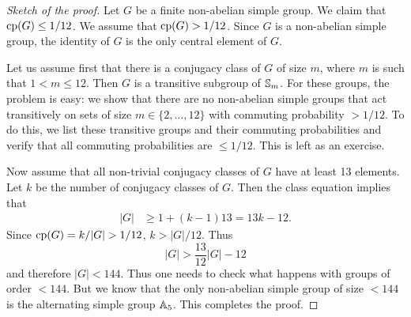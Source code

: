 \begin{proof}[Sketch of the proof]
Let $G$ be a finite non-abelian simple group. We claim that 
$\operatorname{cp}(G)\leq1/12$. 
We assume that $\operatorname{cp}(G)>1/12$. Since
$G$ is a non-abelian simple group, 
the identity of $G$ is the only central element of $G$. 

Let us assume first that there is a conjugacy class of $G$ of size $m$, where
$m$ is such that $1<m\leq 12$. Then $G$ is a transitive subgroup of $\mathbb{S}_m$.
For these groups, the problem is easy: we show that there are no non-abelian simple groups
that act transitively on sets of size $m\in\{2,\dots,12\}$ with commuting
probability $>1/12$. To do this, we list these transitive groups and their commuting
probabilities and verify that all commuting probabilities are $\leq
1/12$. This is left as an exercise. 

Now assume that all non-trivial conjugacy classes of $G$ have at least 13 elements. Let $k$ be the number of conjugacy classes of $G$. 
Then the class equation implies that
\begin{align*}
	|G|&\geq 1+(k-1)13=13k-12.
\end{align*}
Since $\cp(G)=k/|G|>1/12$, $k>|G|/12$. Thus 
\[
|G|>\frac{13}{12}|G|-12
\]
and therefore $|G|<144$. Thus one needs to check what happens with groups
of order $<144$. 
But we know that the only non-abelian simple group of size
$<144$ is the alternating simple group $\mathbb{A}_5$. 
This completes the proof. 
\end{proof}

